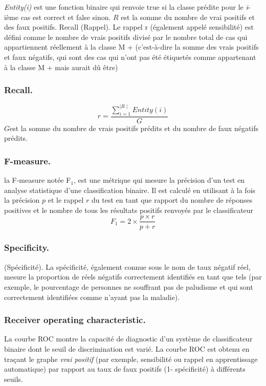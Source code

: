\textit{Entity(i)} est une fonction binaire qui renvoie true si la classe prédite pour le \textit{i}-ième cas est correct et false sinon. $R$ est la somme du nombre de vrai positifs et des faux positifs.
Recall (Rappel). Le rappel r (également appelé sensibilité) est défini comme le nombre de vrais positifs divisé par le nombre total de cas qui appartiennent réellement à la classe M + (c’est-à-dire la somme des vrais positifs et faux négatifs, qui sont des cas qui n'ont pas été étiquetés comme appartenant à la classe M + mais aurait dû être)
\subsubsection{Recall.}
\begin{equation}
r=\frac{\sum_{i=1}^{\mid R\mid}Entity(i)}{G}
\label{recall}
\end{equation}
$G$est la somme du nombre de vrais positifs prédits et du nombre de faux négatifs prédits.
\subsubsection{F-measure.}la F-measure notée F$_1$, est une métrique qui mesure la précision d'un test en analyse statistique d'une classification binaire. Il est calculé en utilisant à la fois la précision $p$ et le rappel $r$ du test en tant que rapport du nombre de réponses positives et le nombre de tous les résultats positifs renvoyés par le classificateur
\begin{equation}
F_1 = 2 \times \frac{p\times r}{p + r}
\label{f-measure}
\end{equation}
\subsubsection{Specificity.}(Spécificité). La spécificité, également connue sous le nom de taux négatif réel, mesure la proportion de réels négatifs correctement identifiés en tant que tels (par exemple, le pourcentage de personnes ne souffrant pas de paludisme et qui sont correctement identifiées comme n’ayant pas la maladie).
\subsubsection{Receiver operating characteristic.}
La courbe ROC montre la capacité de diagnostic d'un système de classificateur binaire dont le seuil de discrimination est varié. La courbe ROC est obtenu en traçant le graphe \emph{vrai positif} (par exemple, sensibilité ou rappel en apprentissage automatique) par rapport au taux de faux positifs (1- spécificité) à différents seuils.
